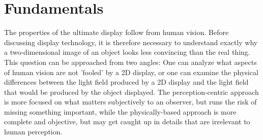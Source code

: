 \section{Fundamentals}
The properties of the ultimate display follow from human vision. Before discussing display technology, it is therefore necessary to understand exactly why a two-dimensional image of an object looks less convincing than the real thing. This question can be approached from two angles: One can analyze what aspects of human vision are not 'fooled' by a 2D display, or one can examine the physical differences between the light field produced by a 2D display and the light field that would be produced by the object displayed. The perception-centric approach is more focused on what matters subjectively to an observer, but runs the risk of missing something important, while the physically-based approach is more complete and objective, but may get caught up in details that are irrelevant to human perception.
